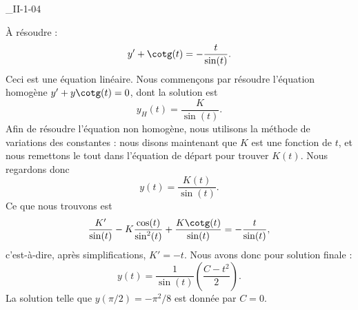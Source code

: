 

\begin{corrige}{_II-1-04}

À résoudre : 
\begin{equation}
	y'+\cotg(t)=-\frac{ t }{ \sin(t) }.
\end{equation}
Ceci est une équation linéaire. Nous commençons par résoudre l'équation homogène $y'+y\cotg(t)=0$, dont la solution est
\begin{equation}
	y_H(t)=\frac{ K }{ \sin(t) }.
\end{equation}
Afin de résoudre l'équation non homogène, nous utilisons la méthode de variations des constantes : nous disons maintenant que $K$ est une fonction de $t$, et nous remettons le tout dans l'équation de départ pour trouver $K(t)$. Nous regardons donc
\begin{equation}
	y(t)=\frac{ K(t) }{ \sin(t) }.
\end{equation}
Ce que nous trouvons est
\begin{equation}
	\frac{ K' }{ \sin(t) }-K\frac{ \cos(t) }{ \sin^2(t) }+\frac{ K\cotg(t) }{ \sin(t) }=-\frac{ t }{ \sin(t) },
\end{equation}
c'est-à-dire, après simplifications,  $K'=-t$. Nous avons donc pour solution finale :
\begin{equation}
	y(t)=\frac{ 1 }{ \sin(t) }\left( \frac{ C-t^2 }{ 2 } \right).
\end{equation}
La solution telle que $y(\pi/2)=-\pi^2/8$ est donnée par $C=0$.

\end{corrige}
